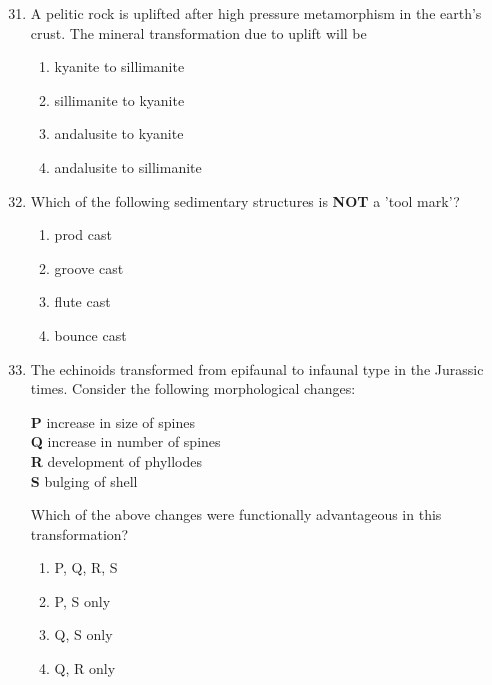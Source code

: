 \documentclass[journal,12pt,onecolumn]{IEEEtran}
\theoremstyle{remark}
\begin{document}
\begin{enumerate}
\setcounter{enumi}{30}

\item A pelitic rock is uplifted after high pressure metamorphism in the earth's crust. The mineral transformation due to uplift will be
\begin{multicols}{2}
\begin{enumerate}
\item kyanite to sillimanite  
\item sillimanite to kyanite  
\item andalusite to kyanite  
\item andalusite to sillimanite  
\end{enumerate}
\end{multicols}

\item Which of the following sedimentary structures is  \textbf{NOT} a 'tool mark'?
\begin{multicols}{4}
\begin{enumerate}
\item prod cast  
\item groove cast  
\item flute cast  
\item bounce cast  
\end{enumerate}
\end{multicols}






\item The echinoids transformed from epifaunal to infaunal type in the Jurassic times. Consider the following morphological changes:

\begin{flushleft}
\textbf{P} increase in size of spines  \\
\textbf{Q} increase in number of spines  \\
\textbf{R} development of phyllodes  \\
\textbf{S} bulging of shell
\end{flushleft}

Which of the above changes were functionally advantageous in this transformation?

\begin{multicols}{4}
\begin{enumerate}
\item P, Q, R, S  
\item P, S only  
\item Q, S only  
\item Q, R only  
\end{enumerate}
\end{multicols}






\end{enumerate}
\end{document}
